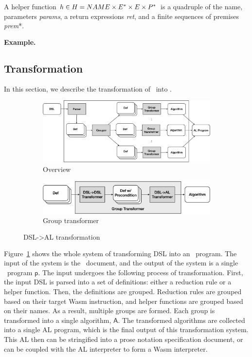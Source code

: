 A helper function $h \in H = NAME \times E^\ast \times E \times P^\ast$ is a quadruple of
the name, parameters \textit{params}, a return expressions \textit{ret}, and a finite sequences of premises \textit{prem}*.

\textbf{Example.} 

\subsection{Transformation}
In this section, we describe the transformation of \dsl~into \al.

\begin{figure}
  \centering
  \begin{subfigure}[b]{0.9\textwidth}
    \includegraphics[width=\textwidth]{img/trans1}
    \caption{Overview}
    \label{fig:overview}
  \end{subfigure}
  \hfill
  \begin{subfigure}[b]{0.9\textwidth}
    \includegraphics[width=\textwidth]{img/trans2}
    \caption{Group transformer}
    \label{fig:grouptrans}
  \end{subfigure}
  \caption{DSL->AL transformation}
  \label{fig:trans}
\end{figure}


Figure~\ref{fig:overview} shows the whole system of transforming DSL into an \al~program.
The input of the system is the \dsl~document,
and the output of the system is a single \al~program $\mathsf{p}$.
The input undergoes the following process of transformation.
First, the input DSL is parsed into a set of definitions: either a reduction rule or a
helper function. Then, the definitions are grouped. Reduction rules are grouped based on
their target Wasm instruction, and helper functions are grouped based on their names.
As a result, multiple groups are formed. Each group is transformed into a single algorithm,
$\mathsf{A}$. The transformed algorithms are collected into a single AL program, which is the
final output of this transformation system. This AL then can be stringified into a
prose notation specification document, or can be coupled with the AL interpreter to form a Wasm interpreter.

